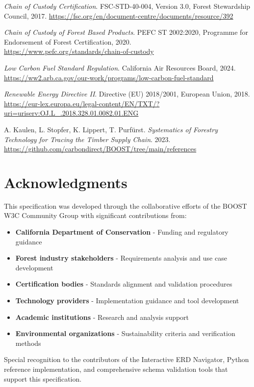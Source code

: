 \documentclass{article}
\begin{document}
\begin{thebibliography}{99}
\textit{Chain of Custody Certification}. FSC-STD-40-004, Version 3.0, Forest Stewardship Council, 2017.
\url{https://fsc.org/en/document-centre/documents/resource/392}

\textit{Chain of Custody of Forest Based Products}. PEFC ST 2002:2020, Programme for Endorsement of Forest Certification, 2020.
\url{https://www.pefc.org/standards/chain-of-custody}

\textit{Low Carbon Fuel Standard Regulation}. California Air Resources Board, 2024.
\url{https://ww2.arb.ca.gov/our-work/programs/low-carbon-fuel-standard}

\textit{Renewable Energy Directive II}. Directive (EU) 2018/2001, European Union, 2018.
\url{https://eur-lex.europa.eu/legal-content/EN/TXT/?uri=uriserv:OJ.L_.2018.328.01.0082.01.ENG}

A. Kaulen, L. Stopfer, K. Lippert, T. Purfürst. \textit{Systematics of Forestry Technology for Tracing the Timber Supply Chain}. 2023.
\url{https://github.com/carbondirect/BOOST/tree/main/references}

\end{thebibliography}

\section*{Acknowledgments}

This specification was developed through the collaborative efforts of the BOOST W3C Community Group with significant contributions from:

\begin{itemize}
    \item \textbf{California Department of Conservation} - Funding and regulatory guidance
    \item \textbf{Forest industry stakeholders} - Requirements analysis and use case development  
    \item \textbf{Certification bodies} - Standards alignment and validation procedures
    \item \textbf{Technology providers} - Implementation guidance and tool development
    \item \textbf{Academic institutions} - Research and analysis support
    \item \textbf{Environmental organizations} - Sustainability criteria and verification methods
\end{itemize}

Special recognition to the contributors of the Interactive ERD Navigator, Python reference implementation, and comprehensive schema validation tools that support this specification.

\newpage
\printindex
\end{document}
